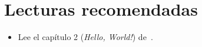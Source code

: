 \section{Lecturas recomendadas}

\begin{itemize}

\item Lee el capítulo 2 (\emph{Hello, World!}) de~\cite{stroustrup:2014}.

\end{itemize}
